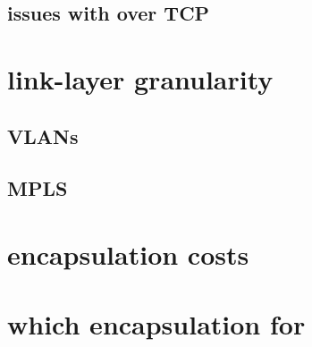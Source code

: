 \subsection{issues with over TCP}


\section{link-layer granularity}


\subsection{VLANs}



\subsection{MPLS}



\section{encapsulation costs}


\section{which encapsulation for}

